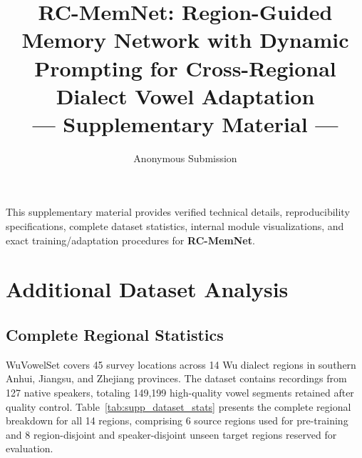 \documentclass[letterpaper]{article}
\title{RC-MemNet: Region-Guided Memory Network with Dynamic Prompting for Cross-Regional Dialect Vowel Adaptation\\--- Supplementary Material ---}
\author{Anonymous Submission}
\begin{document}
\maketitle

This supplementary material provides verified technical details, reproducibility specifications, complete dataset statistics, internal module visualizations, and exact training/adaptation procedures for \textbf{RC-MemNet}.

\section{Additional Dataset Analysis}
\label{sec:supp_dataset}

\subsection{Complete Regional Statistics}
WuVowelSet covers 45 survey locations across 14 Wu dialect regions in southern Anhui, Jiangsu, and Zhejiang provinces. The dataset contains recordings from 127 native speakers, totaling 149,199 high-quality vowel segments retained after quality control. Table~\ref{tab:supp_dataset_stats} presents the complete regional breakdown for all 14 regions, comprising 6 source regions used for pre-training and 8 region-disjoint and speaker-disjoint unseen target regions reserved for evaluation.
\end{document}
